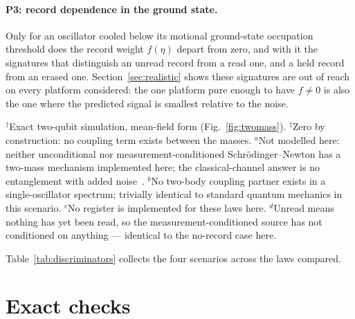 \documentclass[aps,pra,reprint,amsmath,amssymb,superscriptaddress]{revtex4-2}
\begin{document}
\paragraph{P3: record dependence in the ground state.}
Only for an oscillator cooled below its motional ground-state occupation
threshold does the record weight $f(\eta)$ depart from zero, and with it the
signatures that distinguish an unread record from a read one, and a held
record from an erased one. Section~\ref{sec:realistic} shows these signatures
are out of reach on every platform considered: the one platform pure enough to
have $f\neq0$ is also the one where the predicted signal is smallest relative
to the noise.

\begin{table}[t]
  \centering
  \caption{Discriminators: this law (both forms) against quantized gravity,
    standard quantum mechanics, and the unconditional and
    measurement-conditioned Schr\"odinger--Newton alternatives, across four
    scenarios. Dashes mark combinations not modelled here; see the
    footnotes.}
  \label{tab:discriminators}
  \footnotesize
  
  \vspace{2pt}
  {\footnotesize
  $^{\dagger}$Exact two-qubit simulation, mean-field form (Fig.~\ref{fig:twomass}).\quad
  $^{\ddagger}$Zero by construction: no coupling term exists between the masses.\quad
  $^{a}$Not modelled here: neither unconditional nor measurement-conditioned
  Schr\"odinger--Newton has a two-mass mechanism implemented here; the
  classical-channel answer is no entanglement with added
  noise~\cite{Kafri2014}.\quad
  $^{b}$No two-body coupling partner exists in a single-oscillator spectrum;
  trivially identical to standard quantum mechanics in this scenario.\quad
  $^{c}$No register is implemented for these laws here.\quad
  $^{d}$Unread means nothing has yet been read, so the measurement-conditioned
  source has not conditioned on anything --- identical to the no-record case
  here.
  }
\end{table}

Table~\ref{tab:discriminators} collects the four scenarios across the laws
compared.

\section{Exact checks}
\label{sec:checks}
\end{document}
